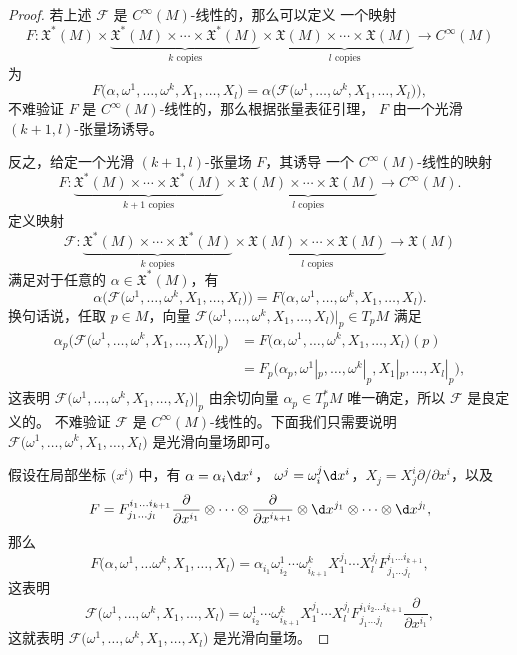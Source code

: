 \begin{proof}
  若上述 $\mathcal{F}$ 是 $C^\infty(M)$-线性的，那么可以定义
  一个映射
  \[
    F: \mathfrak{X}^*(M)\times\underbrace{\mathfrak{X}^*(M)\times\cdots\times \mathfrak{X}^*(M)}
    _{\text{$k$ copies}}\times \underbrace{\mathfrak{X}(M)\times\cdots\times \mathfrak{X}(M)}
    _{\text{$l$ copies}}\to C^\infty(M)
  \]
  为 
  \[
    F\bigl(\alpha,\omega^1,\dots,\omega^k,X_1,\dots,X_l\bigr)  
    =\alpha\bigl(\mathcal{F}\bigl(\omega^1,\dots,\omega^k,X_1,\dots,X_l\bigr)\bigr),
  \]
  不难验证 $F$ 是 $C^\infty(M)$-线性的，那么根据张量表征引理，
  $F$ 由一个光滑 $(k+1,l)$-张量场诱导。

  反之，给定一个光滑 $(k+1,l)$-张量场 $F$，其诱导
  一个 $C^\infty(M)$-线性的映射
  \[
    F:  \underbrace{\mathfrak{X}^*(M)\times\cdots\times \mathfrak{X}^*(M)}
    _{\text{$k+1$ copies}}\times \underbrace{\mathfrak{X}(M)\times\cdots\times \mathfrak{X}(M)}
    _{\text{$l$ copies}}\to C^\infty(M).
  \]
  定义映射
  \[
    \mathcal{F}:\underbrace{\mathfrak{X}^*(M)\times\cdots\times \mathfrak{X}^*(M)}
    _{\text{$k$ copies}}\times \underbrace{\mathfrak{X}(M)\times\cdots\times \mathfrak{X}(M)}
    _{\text{$l$ copies}}\to \mathfrak{X}(M)
  \]
  满足对于任意的 $\alpha\in \mathfrak{X}^*(M)$，有
  \[
    \alpha\bigl(\mathcal{F}\bigl(\omega^1,\dots,\omega^k,X_1,\dots,X_l\bigr)  \bigr)  
    =F\bigl(\alpha,\omega^1,\dots,\omega^k,X_1,\dots,X_l\bigr)  .
  \]
  换句话说，任取 $p\in M$，向量 $\mathcal{F}\bigl(\omega^1,\dots,\omega^k,X_1,\dots,X_l\bigr)\big|_p\in T_pM$
  满足
  \begin{align*}
    \alpha_p\bigl(\mathcal{F}\bigl(\omega^1,\dots,\omega^k,X_1,\dots,X_l\bigr)\big|_p\bigr)  
    &=F\bigl(\alpha,\omega^1,\dots,\omega^k,X_1,\dots,X_l\bigr) (p)\\
    &=F_p\bigl(\alpha_p,\omega^1|_p,\dots,\omega^k|_p,X_1|_p,\dots,X_l|_p\bigr),
  \end{align*}
  这表明 $\mathcal{F}\bigl(\omega^1,\dots,\omega^k,X_1,\dots,X_l\bigr)\big|_p$ 由余切向量
  $\alpha_p\in T_p^*M$ 唯一确定，所以 $\mathcal{F}$ 是良定义的。
  不难验证 $\mathcal{F}$ 是 $C^\infty(M)$-线性的。下面我们只需要说明 
  $\mathcal{F}\bigl(\omega^1,\dots,\omega^k,X_1,\dots,X_l\bigr)$ 是光滑向量场即可。
  
  假设在局部坐标 $\bigl(x^i\bigr)$ 中，有 $\alpha=\alpha_i\d x^i$，
  $\omega^j=\omega^j_i\d x^i$，$X_j=X_j^i\partial/\partial x^i$，以及
  \[
    F=F_{j_1\dots j_l}^{i_1\dots i_{k+1}}
    \frac{\partial}{\partial x^{i_1}}\otimes  \cdots
    \otimes \frac{\partial}{\partial x^{i_{k+1}}}\otimes \d x^{j_1}
    \otimes\cdots\otimes \d x^{j_{l}},
  \]
  那么
  \[
    F\bigl(\alpha,\omega^1,\dots\omega^k,X_1,\dots,X_l\bigr)  
    =\alpha_{i_1}\omega^1_{i_2}\cdots\omega^{k}_{i_{k+1}}
    X_1^{j_1}\cdots X_l^{j_l}F_{j_1\dots j_l}^{i_1\dots i_{k+1}},
  \]
  这表明
  \[
    \mathcal{F}\bigl(\omega^1,\dots,\omega^k,X_1,\dots,X_l\bigr)=
    \omega^1_{i_2}\cdots\omega^{k}_{i_{k+1}}
    X_1^{j_1}\cdots X_l^{j_l}F_{j_1\dots j_l}^{i_1i_2\dots i_{k+1}}
    \frac{\partial}{\partial x^{i_1}},
  \]
  这就表明 $\mathcal{F}\bigl(\omega^1,\dots,\omega^k,X_1,\dots,X_l\bigr)$
  是光滑向量场。
\end{proof}

